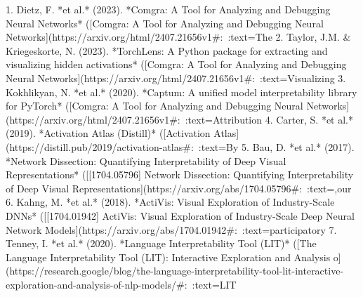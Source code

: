 1. Dietz, F. *et al.* (2023). *Comgra: A Tool for Analyzing and Debugging Neural Networks* ([Comgra: A Tool for Analyzing and Debugging Neural Networks](https://arxiv.org/html/2407.21656v1#:~:text=The%
2. Taylor, J.M. & Kriegeskorte, N. (2023). *TorchLens: A Python package for extracting and visualizing hidden activations* ([Comgra: A Tool for Analyzing and Debugging Neural Networks](https://arxiv.org/html/2407.21656v1#:~:text=Visualizing%
3. Kokhlikyan, N. *et al.* (2020). *Captum: A unified model interpretability library for PyTorch* ([Comgra: A Tool for Analyzing and Debugging Neural Networks](https://arxiv.org/html/2407.21656v1#:~:text=Attribution%
4. Carter, S. *et al.* (2019). *Activation Atlas (Distill)* ([Activation Atlas](https://distill.pub/2019/activation-atlas#:~:text=By%
5. Bau, D. *et al.* (2017). *Network Dissection: Quantifying Interpretability of Deep Visual Representations* ([[1704.05796] Network Dissection: Quantifying Interpretability of Deep Visual Representations](https://arxiv.org/abs/1704.05796#:~:text=,our%
6. Kahng, M. *et al.* (2018). *ActiVis: Visual Exploration of Industry-Scale DNNs* ([[1704.01942] ActiVis: Visual Exploration of Industry-Scale Deep Neural Network Models](https://arxiv.org/abs/1704.01942#:~:text=participatory%
7. Tenney, I. *et al.* (2020). *Language Interpretability Tool (LIT)* ([The Language Interpretability Tool (LIT): Interactive Exploration and Analysis o](https://research.google/blog/the-language-interpretability-tool-lit-interactive-exploration-and-analysis-of-nlp-models/#:~:text=LIT%
